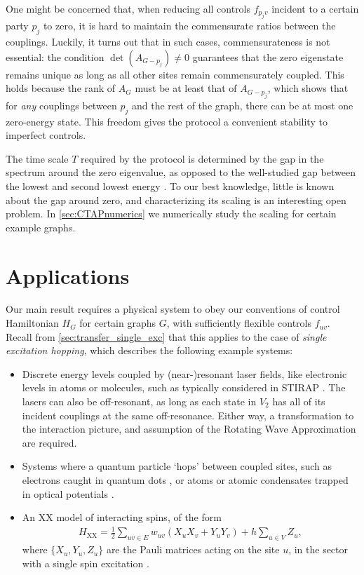 One might be concerned that, when reducing all controls $f_{p_j v}$ incident to a certain party $p_j$ to zero, it is hard to maintain the commensurate ratios between the couplings. Luckily, it turns out that in such cases, commensurateness is not essential: the condition $\det(A_{G-p_j}) \neq 0$ guarantees that the zero eigenstate remains unique as long as all other sites remain commensurately coupled. This holds because the rank of $A_G$ must be at least that of $A_{G-p_j}$, which shows that for \emph{any} couplings between $p_j$ and the rest of the graph, there can be at most one zero-energy state. This freedom gives the protocol a convenient stability to imperfect controls.

 The time scale $T$ required by the protocol is determined by the gap in the spectrum around the zero eigenvalue, as opposed to the well-studied gap between the lowest and second lowest energy \cite{Brouwer2012}. To our best knowledge, little is known about the gap around zero, and characterizing its scaling is an interesting open problem. In \cref{sec:CTAPnumerics} we numerically study the scaling for certain example graphs. 







\section{Applications}
\label{sec:CTAPapplications}
Our main result requires a physical system to obey our conventions of control Hamiltonian $H_G$ for certain graphs $G$, with sufficiently flexible controls $f_{uv}$. Recall from \cref{sec:transfer_single_exc} that this applies to the case of \emph{single excitation hopping}, which describes the following example systems:
\begin{itemize}
\item Discrete energy levels coupled by (near-)resonant laser fields, like electronic levels in atoms or molecules, such as typically considered in STIRAP \cite{Vitanov2017}. The lasers can also be off-resonant, as long as each state in $V_2$ has all of its incident couplings at the same off-resonance. Either way, a transformation to the interaction picture, and assumption of the Rotating Wave Approximation are required. 
\item Systems where a quantum particle `hops' between coupled sites, such as electrons caught in quantum dots \cite{Greentree2004,Hensgens2017}, or atoms or atomic condensates trapped in optical potentials \cite{Eckert2004,Graefe2006,Bloch2012}. 
\item An XX model of interacting spins, of the form 
\begin{align*}
H_\text{XX} = \frac{1}{2} \sum_{uv \in E} w_{uv} \left( X_u X_v + Y_u Y_v \right) + h \sum_{u \in V} Z_u,
\end{align*}
where $\{X_u,Y_u,Z_u\}$ are the Pauli matrices acting on the site $u$, in the sector with a single spin excitation \cite{Ohshima2007}. 
\end{itemize}

